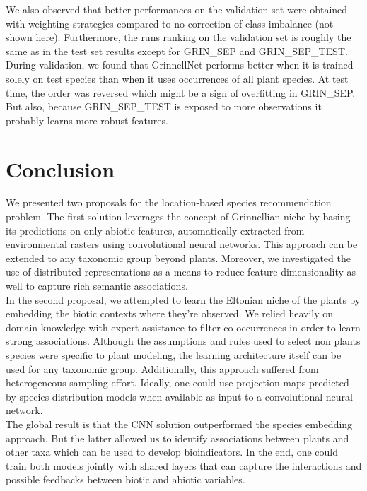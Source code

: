 \documentclass[]{article}
\begin{document}
\noindent We also observed that better performances on the validation set were obtained with weighting strategies compared to no correction of class-imbalance (not shown here). Furthermore, the runs ranking on the validation set is roughly the same as in the test set results except for GRIN\_SEP and GRIN\_SEP\_TEST. During validation, we found that GrinnellNet performs better when it is trained solely on test species than when it uses occurrences of all plant species. At test time, the order was reversed which might be a sign of overfitting in GRIN\_SEP. But also, because GRIN\_SEP\_TEST is exposed to more observations it probably learns more robust features.
 

\section{Conclusion}
We presented two proposals for the location-based species recommendation problem. The first solution leverages the concept of Grinnellian niche by basing its predictions on only abiotic features, automatically extracted from environmental rasters using convolutional neural networks. This approach can be extended to any taxonomic group beyond plants. Moreover, we investigated the use of distributed representations as a means to reduce feature dimensionality as well to capture rich semantic associations. \\ 

\noindent In the second proposal, we attempted to learn the Eltonian niche of the plants by embedding the biotic contexts where they're observed. We relied heavily on domain knowledge with expert assistance to filter co-occurrences in order to learn strong associations. Although the assumptions and rules used to select non plants species were specific to plant modeling, the learning architecture itself can be used for any taxonomic group. Additionally, this approach suffered from heterogeneous sampling effort. Ideally, one could use projection maps predicted by species distribution models when available as input to a convolutional neural network.\\ 

\noindent The global result is that the CNN solution outperformed the species embedding approach. But the latter allowed us to identify associations between plants and other taxa which can be used to develop bioindicators. In the end, one could train both models jointly with shared layers that can capture the interactions and possible feedbacks between biotic and abiotic variables.
  
\end{document}
